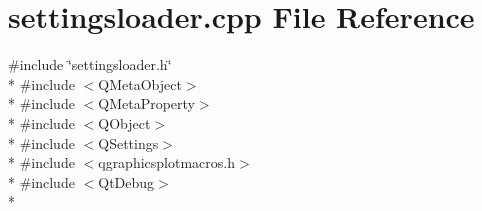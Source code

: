 \section{settingsloader.\+cpp File Reference}
\label{properties_2settingsloader_8cpp}
{\ttfamily \#include \char`\"{}settingsloader.\+h\char`\"{}}\\*
{\ttfamily \#include $<$Q\+Meta\+Object$>$}\\*
{\ttfamily \#include $<$Q\+Meta\+Property$>$}\\*
{\ttfamily \#include $<$Q\+Object$>$}\\*
{\ttfamily \#include $<$Q\+Settings$>$}\\*
{\ttfamily \#include $<$qgraphicsplotmacros.\+h$>$}\\*
{\ttfamily \#include $<$Qt\+Debug$>$}\\*
